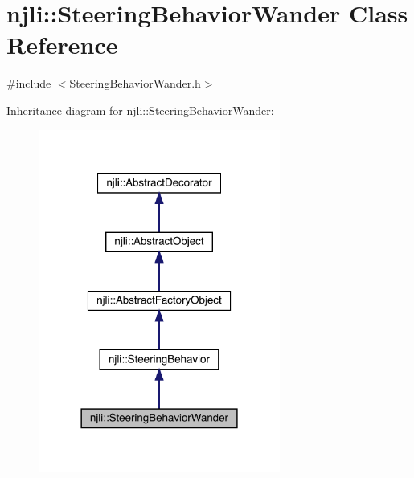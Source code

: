 \hypertarget{classnjli_1_1_steering_behavior_wander}{}\section{njli\+:\+:Steering\+Behavior\+Wander Class Reference}
\label{classnjli_1_1_steering_behavior_wander}


{\ttfamily \#include $<$Steering\+Behavior\+Wander.\+h$>$}



Inheritance diagram for njli\+:\+:Steering\+Behavior\+Wander\+:\nopagebreak
\begin{figure}[H]
\begin{center}
\leavevmode
\includegraphics[width=225pt]{classnjli_1_1_steering_behavior_wander__inherit__graph}
\end{center}
\end{figure}


